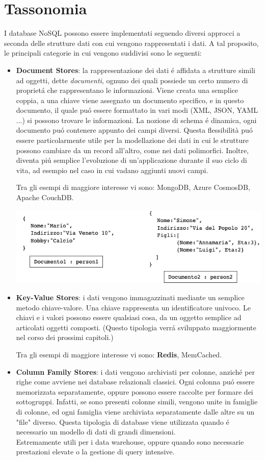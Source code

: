 \section{Tassonomia}
I database NoSQL possono essere implementati seguendo diversi approcci a seconda delle strutture dati con cui vengono
rappresentati i dati.
A tal proposito, le principali categorie in cui vengono suddivisi sono le seguenti:
\begin{itemize}
    \item \textbf{Document Stores}: la rappresentazione dei dati é affidata a strutture simili ad oggetti, dette \emph{documenti}, ognuno dei
    quali possiede un certo numero di proprietá che rappresentano le informazioni.
    Viene creata una semplice coppia, a una chiave viene assegnato un documento specifico, e in questo documento, il quale puó essere
    formattato in vari modi (XML, JSON, YAML ...) si possono trovare le informazioni.
    La nozione di schema é dinamica, ogni documento puó contenere appunto dei campi diversi.
    Questa flessibilità puó essere particolarmente
    utile per la modellazione dei dati in cui le strutture possono cambiare da un record all'altro, come nei dati polimorfici.
    Inoltre, diventa piú semplice l'evoluzione di un'applicazione durante il suo ciclo di vita, ad esempio nel caso in cui vadano aggiunti nuovi
    campi.

    Tra gli esempi di maggiore interesse vi sono: MongoDB, Azure CosmosDB, Apache CouchDB.

    \includegraphics[width=1\textwidth]{img/dbDocumentale}

    \item \textbf{Key-Value Stores}: i dati vengono immagazzinati mediante un semplice metodo chiave-valore. Una chiave rappresenta un identificatore
    univoco. Le chiavi e i valori possono essere qualsiasi cosa, da un oggetto semplice ad articolati oggetti composti.
    (Questo tipologia verrá sviluppato maggiormente nel corso dei prossimi capitoli.)

    Tra gli esempi di maggiore interesse vi sono: \textbf{Redis}, MemCached.
    \item \textbf{Column Family Stores}: i dati vengono archiviati per colonne, anziché per righe come avviene nei database relazionali classici.
    Ogni colonna puó essere memorizzata separatamente, oppure possono essere raccolte per formare dei sottogruppi.
    Infatti, se sono presenti colonne simili, vengono unite in famiglie di colonne, ed ogni famiglia
    viene archiviata separatamente dalle altre su un "file" diverso.
    Questa tipologia di database viene utilizzata quando é necessario un modello di dati di grandi dimensioni.\\
    Estremamente utili per i data warehouse, oppure quando sono necessarie prestazioni elevate o la gestione di query intensive.


\end{itemize}
